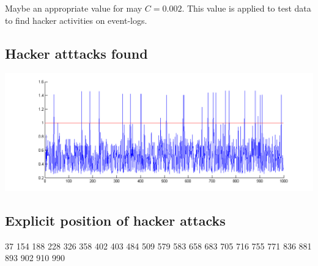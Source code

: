 \documentclass[a4paper, 12pt, titlepage]{article}
\begin{document}
Maybe an appropriate value for may $C=0.002$. This value is applied to test data to find hacker activities on event-logs.

\subsection*{Hacker atttacks found}

\includegraphics[width=\textwidth]{images/plot_testdata.png}

\subsection*{Explicit position of hacker attacks}
    37
   154
   188
   228
   326
   358
   402
   403
   484
   509
   579
   583
   658
   683
   705
   716
   755
   771
   836
   881
   893
   902
   910
   990
\end{document}
